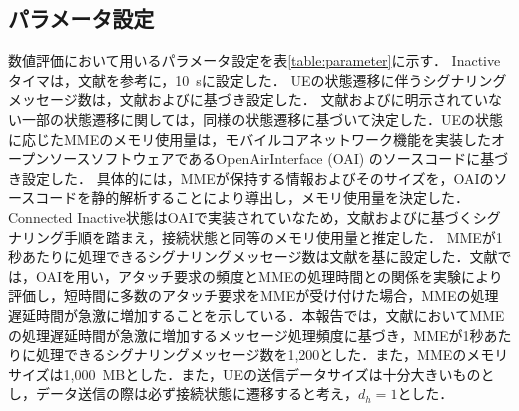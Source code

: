 \documentclass[technicalreport]{ieicej-rev}
\begin{document}
\subsection{パラメータ設定}
\label{sec:パラメータ設定}
数値評価において用いるパラメータ設定を表\ref{table:parameter}に示す．
Inactive タイマは，文献\cite{ANovelStateModelfor5GRadioAccessNetworks}を参考に，10~sに設定した．
UEの状態遷移に伴うシグナリングメッセージ数は，文献\cite{3gpp.23.720}および\cite{ANovelStateModelfor5GRadioAccessNetworks}に基づき設定した．
文献\cite{3gpp.23.720}および\cite{ANovelStateModelfor5GRadioAccessNetworks}に明示されていない一部の状態遷移に関しては，同様の状態遷移に基づいて決定した．UEの状態に応じたMMEのメモリ使用量は，モバイルコアネットワーク機能を実装したオープンソースソフトウェアであるOpenAirInterface (OAI) \cite{OpenAirInterface}のソースコードに基づき設定した．
具体的には，MMEが保持する情報およびそのサイズを，OAIのソースコードを静的解析することにより導出し，メモリ使用量を決定した．
Connected Inactive状態はOAIで実装されていなため，文献\cite{3gpp.23.720}および\cite{ANovelStateModelfor5GRadioAccessNetworks}に基づくシグナリング手順を踏まえ，接続状態と同等のメモリ使用量と推定した．
MMEが1秒あたりに処理できるシグナリングメッセージ数は文献\cite{ExperimentalEvaluationofMobileCoreNetworksonSimultaneousAccessfromM2MIoTTerminals}を基に設定した．文献\cite{ExperimentalEvaluationofMobileCoreNetworksonSimultaneousAccessfromM2MIoTTerminals}では，OAIを用い，アタッチ要求の頻度とMMEの処理時間との関係を実験により評価し，短時間に多数のアタッチ要求をMMEが受け付けた場合，MMEの処理遅延時間が急激に増加することを示している．本報告では，文献\cite{ExperimentalEvaluationofMobileCoreNetworksonSimultaneousAccessfromM2MIoTTerminals}においてMMEの処理遅延時間が急激に増加するメッセージ処理頻度に基づき，MMEが1秒あたりに処理できるシグナリングメッセージ数を1,200とした．また，MMEのメモリサイズは1,000~MBとした．また，UEの送信データサイズは十分大きいものとし，データ送信の際は必ず接続状態に遷移すると考え，$d_h = 1$とした．
\end{document}
